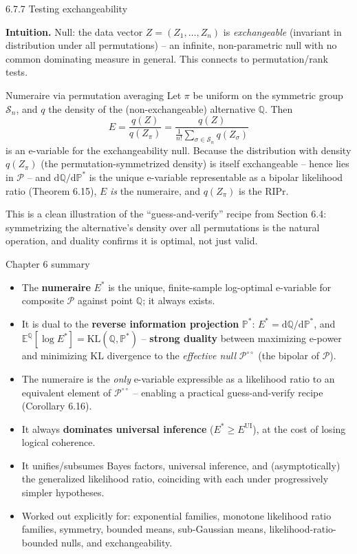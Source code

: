 \documentclass[aspectratio=169,10pt]{beamer}
\newcommand{\bE}{\mathbb{E}}
\newcommand{\bP}{\mathbb{P}}
\newcommand{\bQ}{\mathbb{Q}}
\newcommand{\cP}{\mathcal{P}}
\newcommand{\KL}{\mathrm{KL}}
\begin{document}
\begin{frame}{6.7.7 Testing exchangeability}

\textbf{Intuition.} Null: the data vector $Z=(Z_1,\dots,Z_n)$ is
\emph{exchangeable} (invariant in distribution under all permutations)
-- an infinite, non-parametric null with no common dominating measure
in general. This connects to permutation/rank tests.

\begin{block}{Numeraire via permutation averaging}
Let $\pi$ be uniform on the symmetric group $\mathcal{S}_n$, and $q$ the
density of the (non-exchangeable) alternative $\bQ$. Then
\[
E = \frac{q(Z)}{q(Z_\pi)} = \frac{q(Z)}{\frac{1}{n!}\sum_{\sigma\in\mathcal{S}_n} q(Z_\sigma)}
\]
is an e-variable for the exchangeability null. Because the distribution
with density $q(Z_\pi)$ (the permutation-symmetrized density) is itself
exchangeable -- hence lies in $\cP$ -- and $\mathrm{d}\bQ/\mathrm{d}\bP^*$
is the unique e-variable representable as a bipolar likelihood ratio
(Theorem 6.15), $E$ \emph{is} the numeraire, and $q(Z_\pi)$ is the RIPr.
\end{block}

This is a clean illustration of the ``guess-and-verify'' recipe from
Section 6.4: symmetrizing the alternative's density over all
permutations is the natural operation, and duality confirms it is
optimal, not just valid.
\end{frame}

\begin{frame}{Chapter 6 summary}
\begin{itemize}
\item The \textbf{numeraire} $E^*$ is the unique, finite-sample
log-optimal e-variable for composite $\cP$ against point $\bQ$; it
always exists.
\item It is dual to the \textbf{reverse information projection}
$\bP^*$: $E^* = \mathrm{d}\bQ/\mathrm{d}\bP^*$, and
$\bE^{\bQ}[\log E^*] = \KL(\bQ,\bP^*)$ -- \textbf{strong duality}
between maximizing e-power and minimizing KL divergence to the
\emph{effective null} $\cP^{\circ\circ}$ (the bipolar of $\cP$).
\item The numeraire is the \emph{only} e-variable expressible as a
likelihood ratio to an equivalent element of $\cP^{\circ\circ}$ --
enabling a practical guess-and-verify recipe (Corollary 6.16).
\item It always \textbf{dominates universal inference}
($E^* \ge E^{\mathrm{UI}}$), at the cost of losing logical coherence.
\item It unifies/subsumes Bayes factors, universal inference, and
(asymptotically) the generalized likelihood ratio, coinciding with
each under progressively simpler hypotheses.
\item Worked out explicitly for: exponential families, monotone
likelihood ratio families, symmetry, bounded means, sub-Gaussian
means, likelihood-ratio-bounded nulls, and exchangeability.
\end{itemize}
\end{frame}
\end{document}

